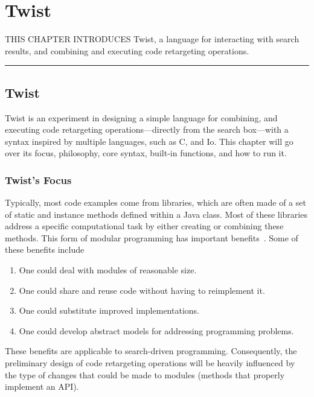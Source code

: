 \chapter{Twist}{}
\label{chap:twist}

\lettrine[lraise=0.1, nindent=0em, slope=-.5em]{T}{HIS CHAPTER INTRODUCES} Twist, a language for interacting with search results, and combining and executing code retargeting operations. 

\fancybreak{\pfbreakdisplay}

\section{Twist}
\label{sec:twist}

Twist is an experiment in designing a simple language for combining, and executing code retargeting operations---directly from the search box---with a syntax inspired by multiple languages, such as C, and Io. This chapter will go over its focus, philosophy, core syntax, built-in functions, and how to run it.

\subsection{Twist's Focus}
\label{sec:focus}

Typically, most code examples come from libraries, which are often made of a set of static and instance methods defined within a Java class. Most of these libraries address a specific computational task by either creating or combining these methods. This form of modular programming has important benefits~\cite{Sedgewick:2011tx}. Some of these benefits include 

\begin{enumerate}
	\item One could deal with modules of reasonable size.
	\item One could share and reuse code without having to reimplement it.
	\item One could substitute improved implementations.
	\item One could develop abstract models for addressing programming problems.
\end{enumerate}

These benefits are applicable to search-driven programming. Consequently, the preliminary design of code retargeting operations will be heavily influenced by the type of changes that could be made to modules (methods that properly implement an API).

